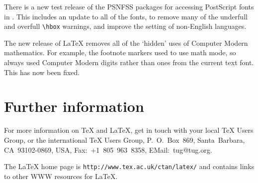 \documentclass{ltnews}
\begin{document}
There is a new test release of the PSNFSS packages for accessing
PostScript fonts in \LaTeXe.  This includes an update to all of the
fonts, to remove many of the underfull and overfull \verb|\hbox|
warnings, and improve the setting of non-English languages.

The new release of \LaTeX{} removes all of the `hidden' uses of
Computer Modern mathematics.  For example, the footnote markers used
to use math mode, so always used Computer Modern digits rather than
ones from the current text font.  This has now been fixed.

\section{Further information}

For more information on \TeX{} and \LaTeX, get in touch with your local
\TeX{} Users Group, or the international \TeX{} Users Group,
P.~O.~Box~869, Santa~Barbara, CA~93102-0869, USA, Fax:~+1~805~963~8358,
EMail:~tug@tug.org.

The \LaTeX{} home page is \verb|http://www.tex.ac.uk/ctan/latex/|
and contains links to other WWW resources for \LaTeX.
\end{document}
